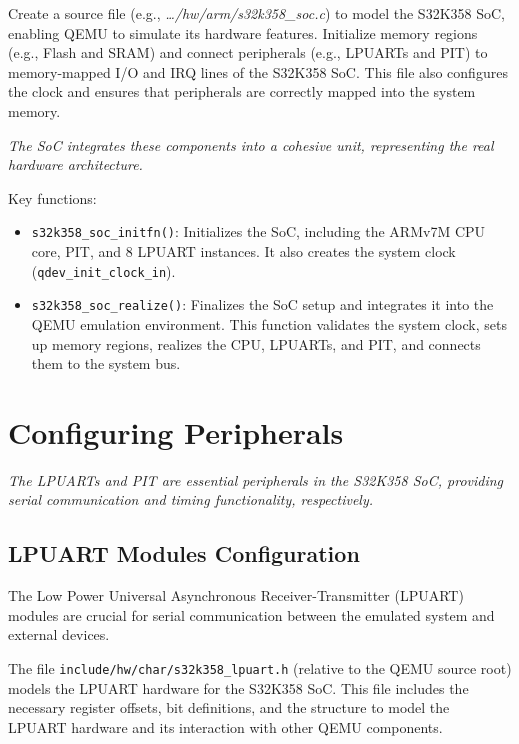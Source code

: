 \noindent Create a source file (e.g., \textit{…/hw/arm/s32k358\_soc.c}) to model the S32K358 SoC, enabling QEMU to simulate its hardware features. Initialize memory regions (e.g., Flash and SRAM) and connect peripherals (e.g., LPUARTs and PIT) to memory-mapped I/O and IRQ lines of the S32K358 SoC. This file also configures the clock and ensures that peripherals are correctly mapped into the system memory.


\begin{center}
    \textit{The SoC integrates these components into a cohesive unit, representing the real hardware architecture.}
\end{center}

\noindent Key functions:
\begin{itemize}
    \item \texttt{s32k358\_soc\_initfn()}: Initializes the SoC, including the ARMv7M CPU core, PIT, and 8 LPUART instances. It also creates the system clock (\texttt{qdev\_init\_clock\_in}).
    \item \texttt{s32k358\_soc\_realize()}: Finalizes the SoC setup and integrates it into the QEMU emulation environment. This function validates the system clock, sets up memory regions, realizes the CPU, LPUARTs, and PIT, and connects them to the system bus.
\end{itemize}

\section{Configuring Peripherals}
\begin{center}
    \textit{The LPUARTs and PIT are essential peripherals in the S32K358 SoC, providing serial communication and timing functionality, respectively.}
\end{center}
\subsection{LPUART Modules Configuration}
The Low Power Universal Asynchronous Receiver-Transmitter (LPUART) modules are crucial for serial communication between the emulated system and external devices.

The file \texttt{include/hw/char/s32k358\_lpuart.h} (relative to the QEMU source root) models the LPUART hardware for the S32K358 SoC. This file includes the necessary register offsets, bit definitions, and the structure to model the LPUART hardware and its interaction with other QEMU components.

